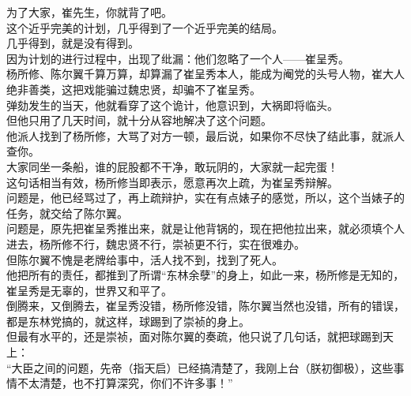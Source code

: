 \begin{multicols}{\theparacolNo}
为了大家，崔先生，你就背了吧。\\

这个近乎完美的计划，几乎得到了一个近乎完美的结局。\\

几乎得到，就是没有得到。\\

因为计划的进行过程中，出现了纰漏：他们忽略了一个人——崔呈秀。\\

杨所修、陈尔翼千算万算，却算漏了崔呈秀本人，能成为阉党的头号人物，崔大人绝非善类，这把戏能骗过魏忠贤，却骗不了崔呈秀。\\

弹劾发生的当天，他就看穿了这个诡计，他意识到，大祸即将临头。\\

但他只用了几天时间，就十分从容地解决了这个问题。\\

他派人找到了杨所修，大骂了对方一顿，最后说，如果你不尽快了结此事，就派人查你。\\

大家同坐一条船，谁的屁股都不干净，敢玩阴的，大家就一起完蛋！\\

这句话相当有效，杨所修当即表示，愿意再次上疏，为崔呈秀辩解。\\

问题是，他已经骂过了，再上疏辩护，实在有点婊子的感觉，所以，这个当婊子的任务，就交给了陈尔翼。\\

问题是，原先把崔呈秀推出来，就是让他背锅的，现在把他拉出来，就必须填个人进去，杨所修不行，魏忠贤不行，崇祯更不行，实在很难办。\\

但陈尔翼不愧是老牌给事中，活人找不到，找到了死人。\\

他把所有的责任，都推到了所谓“东林余孽”的身上，如此一来，杨所修是无知的，崔呈秀是无辜的，世界又和平了。\\

倒腾来，又倒腾去，崔呈秀没错，杨所修没错，陈尔翼当然也没错，所有的错误，都是东林党搞的，就这样，球踢到了崇祯的身上。\\

但最有水平的，还是崇祯，面对陈尔翼的奏疏，他只说了几句话，就把球踢到天上：\\

“大臣之间的问题，先帝（指天启）已经搞清楚了，我刚上台（朕初御极），这些事情不太清楚，也不打算深究，你们不许多事！”\\


\end{multicols}
